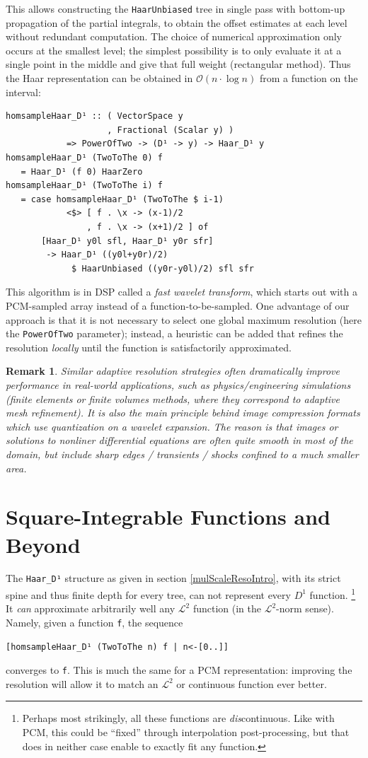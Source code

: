 \documentclass[sigplan,screen]{acmart}
\theoremstyle{acmplain}
\theoremstyle{acmdefinition}
\newtheorem{remark}[theorem]{Remark}
\begin{document}
This allows constructing the \lstinline`HaarUnbiased` tree in single pass with bottom-up propagation of the partial integrals, to obtain the offset estimates at each level without redundant computation.
The choice of numerical approximation only occurs at the smallest level;
the simplest possibility is to only evaluate it at a single point in the middle and give that full weight (rectangular method).
Thus the Haar representation can be obtained in $\mathcal{O}(n\cdot\log n)$ from a function on the interval:
\begin{lstlisting}
homsampleHaar_D¹ :: ( VectorSpace y
                    , Fractional (Scalar y) )
            => PowerOfTwo -> (D¹ -> y) -> Haar_D¹ y
homsampleHaar_D¹ (TwoToThe 0) f
   = Haar_D¹ (f 0) HaarZero
homsampleHaar_D¹ (TwoToThe i) f
   = case homsampleHaar_D¹ (TwoToThe $ i-1)
            <$> [ f . \x -> (x-1)/2
                , f . \x -> (x+1)/2 ] of
       [Haar_D¹ y0l sfl, Haar_D¹ y0r sfr]
        -> Haar_D¹ ((y0l+y0r)/2)
             $ HaarUnbiased ((y0r-y0l)/2) sfl sfr
\end{lstlisting}
This algorithm is in DSP called a \emph{fast wavelet transform}, which starts out with a PCM-sampled array instead of a function-to-be-sampled.
One advantage of our approach is that it is not necessary to select one global maximum resolution (here the \lstinline`PowerOfTwo` parameter); instead, a heuristic can be added that refines the resolution \emph{locally} until the function is satisfactorily approximated.
\begin{remark}
Similar adaptive resolution strategies often dramatically improve performance in real-world applications, such as physics/engineering simulations (finite elements or finite volumes methods, where they correspond to adaptive mesh refinement).
It is also the main principle behind image compression formats which use quantization on a wavelet expansion.
The reason is that images or solutions to nonliner differential equations are often quite smooth in most of the domain, but include sharp edges / transients / shocks confined to a much smaller area.
\end{remark}

\section{Square-Integrable Functions and Beyond}
The \verb`Haar_D¹` structure as given in section \ref{mulScaleResoIntro}, with its strict spine and thus finite depth for every tree, can not represent every $D^1$ function. \footnote{Perhaps most strikingly, all these functions are \emph{dis}continuous. Like with PCM, this could be “fixed” through interpolation post-processing, but that does in neither case enable to exactly fit any function.}
It \emph{can} approximate arbitrarily well any $\mathcal{L}^2$ function (in the $\mathcal{L}^2$-norm sense). Namely, given a function \verb`f`, the sequence
\begin{lstlisting}
[homsampleHaar_D¹ (TwoToThe n) f | n<-[0..]]
\end{lstlisting}
converges to \verb`f`. This is much the same for a PCM representation: improving the resolution will allow it to match an $\mathcal{L}^2$ or continuous function ever better.
\end{document}
